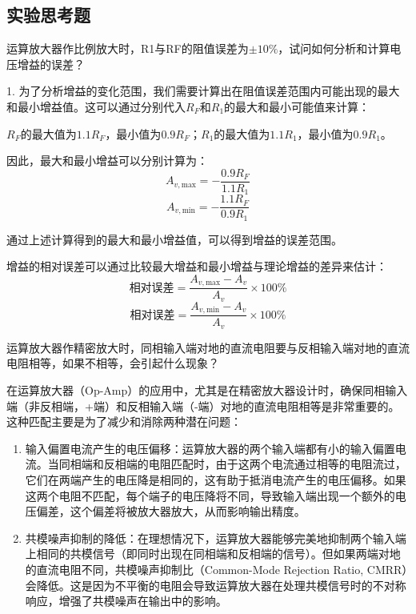 \documentclass[dvipsnames, svgnames,a4paper,11pt]{article}
\begin{document}
	\subsection{实验思考题}
	
	\begin{question}
		运算放大器作比例放大时，R1与RF的阻值误差为$\pm 10 \%$，试问如何分析和计算电压增益的误差？
	\end{question}
	1. 为了分析增益的变化范围，我们需要计算出在阻值误差范围内可能出现的最大和最小增益值。这可以通过分别代入\( R_F \)和\( R_1 \)的最大和最小可能值来计算：
	
	\( R_F \)的最大值为\( 1.1R_F \)，最小值为\( 0.9R_F \)；\( R_1 \)的最大值为\( 1.1R_1 \)，最小值为\( 0.9R_1 \)。
	
	因此，最大和最小增益可以分别计算为：
	\[ A_{v,\text{max}} = -\frac{0.9R_F}{1.1R_1} \]
	\[ A_{v,\text{min}} = -\frac{1.1R_F}{0.9R_1} \]
	
	通过上述计算得到的最大和最小增益值，可以得到增益的误差范围。
	
	增益的相对误差可以通过比较最大增益和最小增益与理论增益的差异来估计：
	\[ \text{相对误差} = \frac{A_{v,\text{max}} - A_v}{A_v} \times 100\% \]
	\[ \text{相对误差} = \frac{A_{v,\text{min}} - A_v}{A_v} \times 100\% \]
	
	\begin{question}
		运算放大器作精密放大时，同相输入端对地的直流电阻要与反相输入端对地的直流电阻相等，如果不相等，会引起什么现象？
	\end{question}
	在运算放大器（Op-Amp）的应用中，尤其是在精密放大器设计时，确保同相输入端（非反相端，+端）和反相输入端（-端）对地的直流电阻相等是非常重要的。这种匹配主要是为了减少和消除两种潜在问题：
	
	\begin{enumerate}
		\item 输入偏置电流产生的电压偏移：运算放大器的两个输入端都有小的输入偏置电流。当同相端和反相端的电阻匹配时，由于这两个电流通过相等的电阻流过，它们在两端产生的电压降是相同的，这有助于抵消电流产生的电压偏移。如果这两个电阻不匹配，每个端子的电压降将不同，导致输入端出现一个额外的电压偏差，这个偏差将被放大器放大，从而影响输出精度。
		
		\item 共模噪声抑制的降低：在理想情况下，运算放大器能够完美地抑制两个输入端上相同的共模信号（即同时出现在同相端和反相端的信号）。但如果两端对地的直流电阻不同，共模噪声抑制比（Common-Mode Rejection Ratio, CMRR）会降低。这是因为不平衡的电阻会导致运算放大器在处理共模信号时的不对称响应，增强了共模噪声在输出中的影响。
	\end{enumerate}
	
\end{document}
